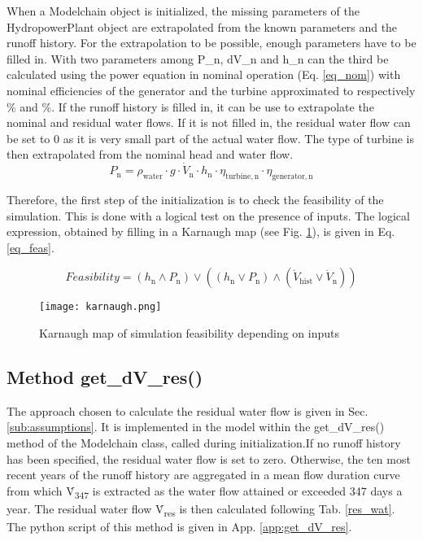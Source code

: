When a Modelchain object is initialized, the missing parameters of the HydropowerPlant object are extrapolated from the known parameters and the runoff history. For the extrapolation to be possible, enough parameters have to be filled in. With two parameters among  P{\_}n, dV{\_}n and h{\_}n can the third be calculated using the power equation in nominal operation (Eq. \eqref{eq_nom}) with nominal efficiencies of the generator and the turbine approximated to respectively \unit[95]{\%} and \unit[90]{\%}. If the runoff history is filled in, it can be use to extrapolate the nominal and residual water flows. If it is not filled in, the residual water flow can be set to 0 as it is very small part of the actual water flow. The type of turbine is then extrapolated from the nominal head and water flow.
\begin{equation}
\label{eq_nom} 
 P_\mathrm{n} = \rho_\mathrm{water} \cdot g \cdot \dot{V}_\mathrm{n} \cdot h_\mathrm{n} \cdot \eta_\mathrm{turbine, n} \cdot \eta_\mathrm{generator, n}
\end{equation}

Therefore, the first step of the initialization is to check the feasibility of the simulation. This is done with a logical test on the presence of inputs. The logical expression, obtained by filling in a Karnaugh map (see Fig. \ref{karnaugh}), is given in Eq. \eqref{eq_feas}.

\begin{equation}
\label{eq_feas} 
 Feasibility = (h_\mathrm{n} \land P_\mathrm{n}) \lor ((h_\mathrm{n} \lor P_\mathrm{n}) \land (\dot{V}_\mathrm{hist} \lor \dot{V}_\mathrm{n}))
\end{equation}

\begin{figure}[H]
\centering
\texttt{[image: karnaugh.png]}
\caption{Karnaugh map of simulation feasibility depending on inputs}
\label{karnaugh}
\end{figure}

\subsection{Method get{\_}dV{\_}res()}
\label{sub:getdVres}
The approach chosen to calculate the residual water flow is given in Sec. \ref{sub:assumptions}. It is implemented in the model within the get{\_}dV{\_}res() method of the Modelchain class, called during initialization.\newline If no runoff history has been specified, the residual water flow is set to zero. Otherwise, the ten most recent years of the runoff history are aggregated in a mean flow duration curve from which \.{V}\textsubscript{347} is extracted as the water flow attained or exceeded 347 days a year. The residual water flow \.{V}\textsubscript{res} is then calculated following Tab. \ref{res_wat}. The python script of this method is given in App. \ref{app:get_dV_res}.

